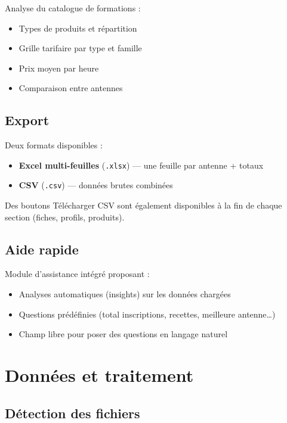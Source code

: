 \documentclass[12pt,a4paper,twoside]{article}
\begin{document}
Analyse du catalogue de formations :
\begin{itemize}[leftmargin=2em]
  \item Types de produits et r\'{e}partition
  \item Grille tarifaire par type et famille
  \item Prix moyen par heure
  \item Comparaison entre antennes
\end{itemize}

\subsection{Export}

Deux formats disponibles :
\begin{itemize}[leftmargin=2em]
  \item \textbf{Excel multi-feuilles} (\texttt{.xlsx}) --- une feuille par antenne + totaux
  \item \textbf{CSV} (\texttt{.csv}) --- donn\'{e}es brutes combin\'{e}es
\end{itemize}

Des boutons \og{}T\'{e}l\'{e}charger CSV\fg{} sont \'{e}galement disponibles \`{a} la fin de chaque section (fiches, profils, produits).

\subsection{Aide rapide}

Module d'assistance int\'{e}gr\'{e} proposant :
\begin{itemize}[leftmargin=2em]
  \item Analyses automatiques (insights) sur les donn\'{e}es charg\'{e}es
  \item Questions pr\'{e}d\'{e}finies (total inscriptions, recettes, meilleure antenne\ldots)
  \item Champ libre pour poser des questions en langage naturel
\end{itemize}

\section{Donn\'{e}es et traitement}

\subsection{D\'{e}tection des fichiers}
\end{document}
